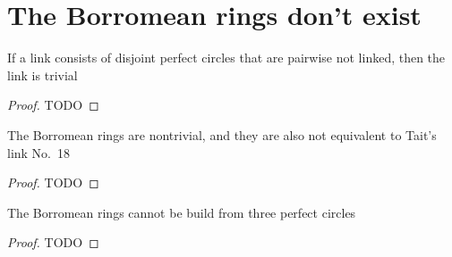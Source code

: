 \chapter{The Borromean rings don't exist}

\begin{theorem}
  \label{ch14theorem1}
  If a link consists of disjoint perfect circles that are pairwise not linked,
  then the link is trivial
\end{theorem}
\begin{proof}
  TODO
\end{proof}

\begin{theorem}
  \label{borromean_nontrivial}
  The Borromean rings are nontrivial,
  and they are also not equivalent to Tait's link No.~18
\end{theorem}
\begin{proof}
  TODO
\end{proof}

\begin{theorem}
  \label{borromean}
  The Borromean rings cannot be build from three perfect circles
\end{theorem}
\begin{proof}
  TODO
\end{proof}
